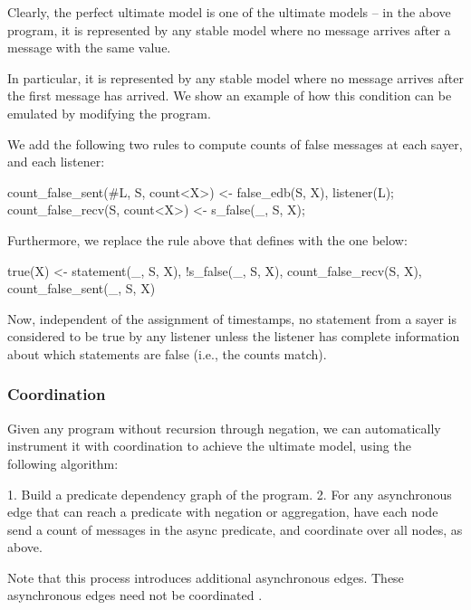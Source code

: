 Clearly, the perfect ultimate model is one of the ultimate models -- in the above program, it is represented by any stable model where no  message arrives after a  message with the same value.

In particular, it is represented by any stable model where no  message arrives after the first  message has arrived.  We show an example of how this condition can be emulated by modifying the program.

We add the following two rules to compute counts of false messages at each sayer, and each listener:

\begin{Dedalus}
count_false_sent(#L, S, count<X>) <- false_edb(S, X), listener(L);
count_false_recv(S, count<X>) <- s_false(_, S, X);
\end{Dedalus}

Furthermore, we replace the rule above that defines  with the one below:

\begin{Dedalus}
true(X) <- statement(_, S, X), !s_false(_, S, X), count_false_recv(S, X), count_false_sent(_, S, X)
\end{Dedalus}

Now, independent of the assignment of timestamps, no statement from a sayer  is considered to be true by any listener unless the listener has complete information about which statements are false (i.e., the counts match). 


\subsubsection{Coordination}
Given any \lang program without recursion through negation, we can automatically instrument it with coordination to achieve the ultimate model, using the following algorithm:

1. Build a predicate dependency graph of the program.
2. For any asynchronous edge that can reach a predicate with negation or aggregation, have each node send a count of messages in the async predicate, and coordinate over all nodes, as above.

Note that this process introduces additional asynchronous edges.  These asynchronous edges need not be coordinated .


